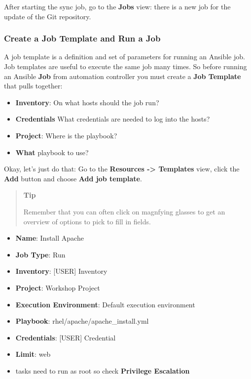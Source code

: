 After starting the sync job, go to the \textbf{Jobs} view: there is a
new job for the update of the Git repository.

\hypertarget{create-a-job-template-and-run-a-job}{%
\subsubsection{Create a Job Template and Run a
Job}\label{create-a-job-template-and-run-a-job}}

A job template is a definition and set of parameters for running an
Ansible job. Job templates are useful to execute the same job many
times. So before running an Ansible \textbf{Job} from automation
controller you must create a \textbf{Job Template} that pulls together:

\begin{itemize}
\item
  \textbf{Inventory}: On what hosts should the job run?
\item
  \textbf{Credentials} What credentials are needed to log into the
  hosts?
\item
  \textbf{Project}: Where is the playbook?
\item
  \textbf{What} playbook to use?
\end{itemize}

Okay, let's just do that: Go to the \textbf{Resources -\textgreater{}
Templates} view, click the \textbf{Add} button and choose \textbf{Add
job template}.

\begin{quote}
\textbf{Tip}

Remember that you can often click on magnfying glasses to get an
overview of options to pick to fill in fields.
\end{quote}
\begin{itemize}
\tightlist
    \item \textbf{Name}: Install Apache
    \item \textbf{Job Type}: Run
    \item \textbf{Inventory}: [USER] Inventory
    \item \textbf{Project}: Workshop Project
    \item \textbf{Execution Environment}: Default execution environment
    \item \textbf{Playbook}: rhel/apache/apache\_install.yml
    \item \textbf{Credentials}: [USER] Credential
    \item \textbf{Limit}: web
    \item tasks need to run as root so check \textbf{Privilege Escalation}
\end{itemize}

